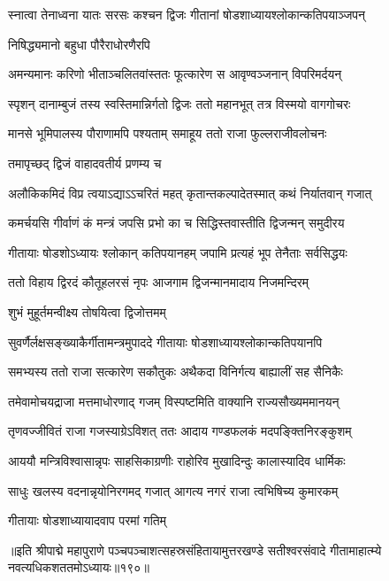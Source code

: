 \twolineshloka
{स्नात्वा तेनाध्वना यातः सरसः कश्चन द्विजः}
{गीतानां षोडशाध्यायश्लोकान्कतिपयाञ्जपन्} %

\onelineshloka
{निषिद्ध्यमानो बहुधा पौरैराधोरणैरपि} %

\twolineshloka
{अमन्यमानः करिणो भीताञ्चलितवांस्ततः}
{फूत्कारेण स आवृण्वञ्जनान् विपरिमर्दयन्} %

\twolineshloka
{स्पृशन् दानाम्बुजं तस्य स्वस्तिमान्निर्गतो द्विजः}
{ततो महानभूत् तत्र विस्मयो वागगोचरः} %

\twolineshloka
{मानसे भूमिपालस्य पौराणामपि पश्यताम्}
{समाहूय ततो राजा फुल्लराजीवलोचनः} %

\onelineshloka
{तमापृच्छद् द्विजं वाहादवतीर्य प्रणम्य च} %


\twolineshloka
{अलौकिकमिदं विप्र त्वयाऽद्याऽऽचरितं महत्}
{कृतान्तकल्पादेतस्मात् कथं निर्यातवान् गजात्} %

\twolineshloka
{कमर्चयसि गीर्वाणं कं मन्त्रं जपसि प्रभो}
{का च सिद्धिस्तवास्तीति द्विजन्मन् समुदीरय} %


\twolineshloka
{गीतायाः षोडशोऽध्यायः श्लोकान् कतिपयानहम्}
{जपामि प्रत्यहं भूप तेनैताः सर्वसिद्धयः} %

\twolineshloka
{ततो विहाय द्विरदं कौतूहलरसं नृपः}
{आजगाम द्विजन्मानमादाय निजमन्दिरम्} %

\onelineshloka
{शुभं मुहूर्तमन्वीक्ष्य तोषयित्वा द्विजोत्तमम्} %

\twolineshloka
{सुवर्णैर्लक्षसङ्ख्याकैर्गीतामन्त्रमुपाददे}
{गीतायाः षोडशाध्यायश्लोकान्कतिपयानपि} %

\twolineshloka
{समभ्यस्य ततो राजा सत्कारेण सकौतुकः}
{अथैकदा विनिर्गत्य बाह्यालीं सह सैनिकैः} %

\twolineshloka
{तमेवामोचयद्राजा मत्तमाधोरणाद् गजम्}
{विस्पष्टमिति वाक्यानि राज्यसौख्यममानयन्} %

\twolineshloka
{तृणवज्जीवितं राजा गजस्याग्रेऽविशत् ततः}
{आदाय गण्डफलकं मदपङ्क्तिनिरङ्कुशम्} %

\twolineshloka
{आययौ मन्त्रिविश्वासान्नृपः साहसिकाग्रणीः}
{राहोरिव मुखादिन्दुः कालास्यादिव धार्मिकः} %

\twolineshloka
{साधुः खलस्य वदनान्नृयोनिरगमद् गजात्}
{आगत्य नगरं राजा त्वभिषिच्य कुमारकम्} %

\onelineshloka
{गीतायाः षोडशाध्यायादवाप परमां गतिम्} %

॥इति श्रीपाद्मे महापुराणे पञ्चपञ्चाशत्सहस्रसंहितायामुत्तरखण्डे सतीश्वरसंवादे गीतामाहात्म्ये नवत्यधिकशततमोऽध्यायः॥१९०॥

